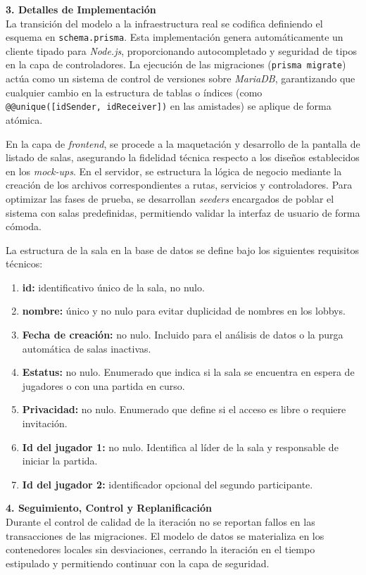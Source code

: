 \textbf{3. Detalles de Implementación} \\
La transición del modelo a la infraestructura real se codifica definiendo el esquema en \texttt{schema.prisma}. Esta implementación genera automáticamente un cliente tipado para \textit{Node.js}, proporcionando autocompletado y seguridad de tipos en la capa de controladores. La ejecución de las migraciones (\texttt{prisma migrate}) actúa como un sistema de control de versiones sobre \textit{MariaDB}, garantizando que cualquier cambio en la estructura de tablas o índices (como \texttt{@@unique([idSender, idReceiver])} en las amistades) se aplique de forma atómica.

En la capa de \textit{frontend}, se procede a la maquetación y desarrollo de la pantalla de listado de salas, asegurando la fidelidad técnica respecto a los diseños establecidos en los \textit{mock-ups}. En el servidor, se estructura la lógica de negocio mediante la creación de los archivos correspondientes a rutas, servicios y controladores. Para optimizar las fases de prueba, se desarrollan \textit{seeders} encargados de poblar el sistema con salas predefinidas, permitiendo validar la interfaz de usuario de forma cómoda.

La estructura de la sala en la base de datos se define bajo los siguientes requisitos técnicos:
\begin{enumerate}
    \item \textbf{id:} identificativo único de la sala, no nulo.
    \item \textbf{nombre:} único y no nulo para evitar duplicidad de nombres en los lobbys.
    \item \textbf{Fecha de creación:} no nulo. Incluido para el análisis de datos o la purga automática de salas inactivas.
    \item \textbf{Estatus:} no nulo. Enumerado que indica si la sala se encuentra en espera de jugadores o con una partida en curso.
    \item \textbf{Privacidad:} no nulo. Enumerado que define si el acceso es libre o requiere invitación.
    \item \textbf{Id del jugador 1:} no nulo. Identifica al líder de la sala y responsable de iniciar la partida.
    \item \textbf{Id del jugador 2:} identificador opcional del segundo participante.
\end{enumerate}

\textbf{4. Seguimiento, Control y Replanificación} \\
Durante el control de calidad de la iteración no se reportan fallos en las transacciones de las migraciones. El modelo de datos se materializa en los contenedores locales sin desviaciones, cerrando la iteración en el tiempo estipulado y permitiendo continuar con la capa de seguridad.

